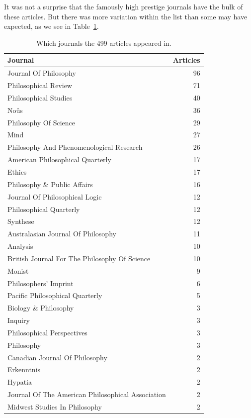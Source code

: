 \documentclass[
  10pt,
  letterpaper,
  DIV=11,
  numbers=noendperiod,
  twoside]{scrartcl}
\begin{document}
It was not a surprise that the famously high prestige journals have the
bulk of these articles. But there was more variation within the list
than some may have expected, as we see in
Table~\ref{tbl-journals-in-main-bib}.

\begin{longtable}[]{@{}lr@{}}

\caption{\label{tbl-journals-in-main-bib}Which journals the 499 articles
appeared in.}

\tabularnewline

\toprule\noalign{}
Journal & Articles \\
\midrule\noalign{}
\endhead
\bottomrule\noalign{}
\endlastfoot
Journal Of Philosophy & 96 \\
Philosophical Review & 71 \\
Philosophical Studies & 40 \\
Noûs & 36 \\
Philosophy Of Science & 29 \\
Mind & 27 \\
Philosophy And Phenomenological Research & 26 \\
American Philosophical Quarterly & 17 \\
Ethics & 17 \\
Philosophy \& Public Affairs & 16 \\
Journal Of Philosophical Logic & 12 \\
Philosophical Quarterly & 12 \\
Synthese & 12 \\
Australasian Journal Of Philosophy & 11 \\
Analysis & 10 \\
British Journal For The Philosophy Of Science & 10 \\
Monist & 9 \\
Philosophers' Imprint & 6 \\
Pacific Philosophical Quarterly & 5 \\
Biology \& Philosophy & 3 \\
Inquiry & 3 \\
Philosophical Perspectives & 3 \\
Philosophy & 3 \\
Canadian Journal Of Philosophy & 2 \\
Erkenntnis & 2 \\
Hypatia & 2 \\
Journal Of The American Philosophical Association & 2 \\
Midwest Studies In Philosophy & 2 \\

\end{longtable}
\end{document}
